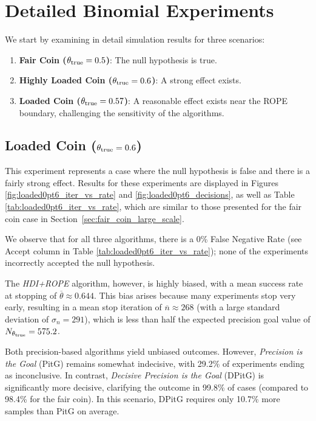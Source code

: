 
\section*{Detailed Binomial Experiments}\label{sec:binomial_appendix}

We start by examining in detail simulation results for three scenarios:
\begin{enumerate}
  \item \textbf{Fair Coin ($\theta_{\rm true}=0.5$)}: The null hypothesis is true.
  \item \textbf{Highly Loaded Coin ($\theta_{\rm true}=0.6$)}: A strong effect exists.
  \item \textbf{Loaded Coin ($\theta_{\rm true}=0.57$)}: A reasonable effect exists near the ROPE boundary, challenging the sensitivity of the algorithms.
\end{enumerate}

\subsection{Loaded Coin ($\theta_{\rm true}=0.6$)}\label{sec:loaded_coin}

This experiment represents a case where the null hypothesis is false and there is a fairly strong effect. Results for these experiments are displayed in Figures \ref{fig:loaded0pt6_iter_vs_rate} and \ref{fig:loaded0pt6_decisions}, as well as Table \ref{tab:loaded0pt6_iter_vs_rate}, which are similar to those presented for the fair coin case in Section~\ref{sec:fair_coin_large_scale}.

We observe that for all three algorithms, there is a 0\% False Negative Rate (see Accept column in Table \ref{tab:loaded0pt6_iter_vs_rate}); none of the experiments incorrectly accepted the null hypothesis.

The \textit{HDI+ROPE} algorithm, however, is highly biased, with a mean success rate at stopping of $\overline{\theta} \approx 0.644$. This bias arises because many experiments stop very early, resulting in a mean stop iteration of $\overline{n} \approx 268$ (with a large standard deviation of $\sigma_n=291$), which is less than half the expected precision goal value of $N_{\theta_{\rm true}}=575.2$.

Both precision-based algorithms yield unbiased outcomes. However, \textit{Precision is the Goal} (PitG) remains somewhat indecisive, with 29.2\% of experiments ending as inconclusive. In contrast, \textit{Decisive Precision is the Goal} (DPitG) is significantly more decisive, clarifying the outcome in 99.8\% of cases (compared to 98.4\% for the fair coin). In this scenario, DPitG requires only 10.7\% more samples than PitG on average.

